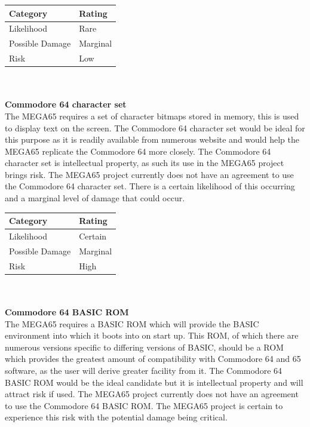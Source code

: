 \begin{tabular}{l|l} %
    	\textbf{Category} 	&	\textbf{Rating} \\
      \hline
     Likelihood			&	Rare \\
     Possible Damage 	& 	Marginal \\
     Risk 				&	Low		\\	
    \end{tabular} \\ \\


\textbf{Commodore 64 character set}\\
The MEGA65 requires a set of character bitmaps stored in memory, this is used to display text on the screen. The Commodore 64 character set would be ideal for this purpose as it is readily available from numerous website and would help the MEGA65 replicate the Commodore 64 more closely. The Commodore 64 character set is intellectual property, as such its use in the MEGA65 project brings risk. The MEGA65 project currently does not have an agreement to use the Commodore 64 character set. There is a certain likelihood of this occurring and a marginal level of damage that could occur. \\

\begin{tabular}{l|l} %
    	\textbf{Category} 	&	\textbf{Rating} \\
      \hline
     Likelihood			&	Certain \\
     Possible Damage 	& 	Marginal \\
     Risk 				&	High		\\	
    \end{tabular} \\ \\


\textbf{Commodore 64 BASIC ROM}\\
The MEGA65 requires a BASIC ROM which will provide the BASIC environment into which it boots into on start up. This ROM, of which there are numerous versions specific to differing versions of BASIC, should be a ROM which provides the greatest amount of compatibility with Commodore 64 and 65 software, as the user will derive greater facility from it. The Commodore 64 BASIC ROM would be the ideal candidate but it is intellectual property and will attract risk if used. The MEGA65 project currently does not have an agreement to use the Commodore 64 BASIC ROM. The MEGA65 project is certain to experience this risk with the potential damage being critical. \\

